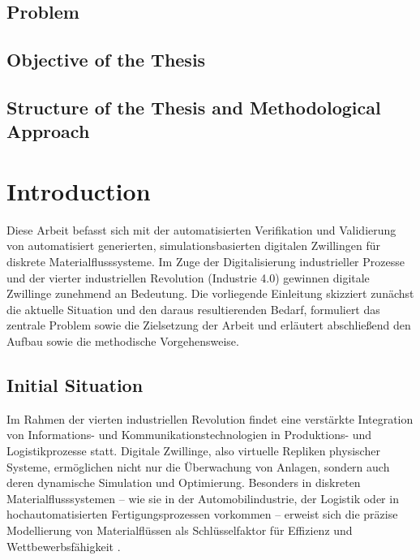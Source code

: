 \section{Problem}

\section{Objective of the Thesis}

\section{Structure of the Thesis and Methodological Approach}

\chapter{Introduction}

Diese Arbeit befasst sich mit der automatisierten Verifikation und Validierung von automatisiert generierten, simulationsbasierten digitalen Zwillingen für diskrete Materialflusssysteme. Im Zuge der Digitalisierung industrieller Prozesse und der vierter industriellen Revolution (Industrie 4.0) gewinnen digitale Zwillinge zunehmend an Bedeutung. Die vorliegende Einleitung skizziert zunächst die aktuelle Situation und den daraus resultierenden Bedarf, formuliert das zentrale Problem sowie die Zielsetzung der Arbeit und erläutert abschließend den Aufbau sowie die methodische Vorgehensweise.

\section{Initial Situation}

Im Rahmen der vierten industriellen Revolution findet eine verstärkte Integration von Informations- und Kommunikationstechnologien in Produktions- und Logistikprozesse statt. Digitale Zwillinge, also virtuelle Repliken physischer Systeme, ermöglichen nicht nur die Überwachung von Anlagen, sondern auch deren dynamische Simulation und Optimierung. Besonders in diskreten Materialflusssystemen – wie sie in der Automobilindustrie, der Logistik oder in hochautomatisierten Fertigungsprozessen vorkommen – erweist sich die präzise Modellierung von Materialflüssen als Schlüsselfaktor für Effizienz und Wettbewerbsfähigkeit \parencite{Grieves2014}.

